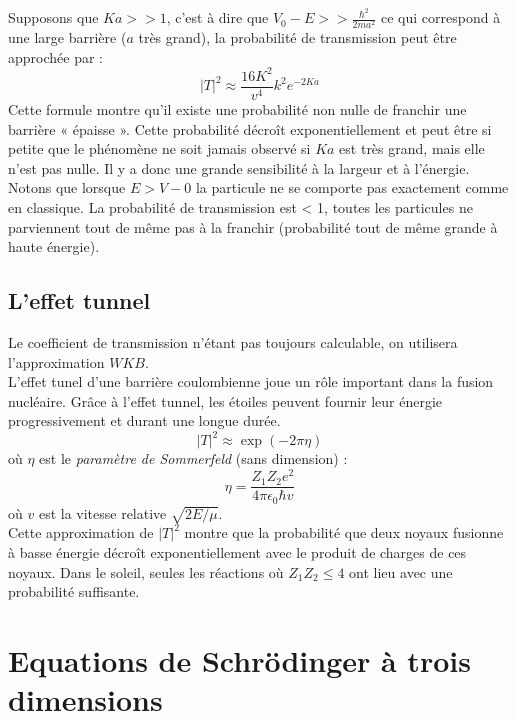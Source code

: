 \documentclass	[11pt, a4paper, openany]{book}
\begin{document}
Supposons que $Ka >> 1$, c'est à dire que $V_0 - E >> \frac{\hbar^2}{2ma^2}$ ce qui correspond à une large barrière ($a$ très grand), la probabilité de transmission peut être approchée par :
\begin{equation}
|T|^2 \approx \frac{16K^2}{v^4}k^2e^{-2Ka}
\end{equation}
Cette formule montre qu'il existe une probabilité non nulle de franchir une barrière
« épaisse ». Cette probabilité décroît exponentiellement et peut être si petite que le
phénomène ne soit jamais observé si $Ka$ est très grand, mais elle n'est pas nulle. Il y a donc une grande sensibilité à la largeur et à l'énergie.\\

Notons que lorsque $E > V-0$ la particule ne se comporte pas exactement comme en classique. La probabilité de transmission est < 1, toutes les particules ne parviennent tout de même pas à la franchir (probabilité tout de même grande à  haute énergie).


\section{L'effet tunnel}
Le coefficient de transmission n'étant pas toujours calculable, on utilisera l'approximation $WKB$.\\

L'effet tunel d'une barrière coulombienne joue un rôle important dans la fusion nucléaire. Grâce à l'effet tunnel, les étoiles peuvent fournir leur énergie progressivement et durant une longue durée.
\begin{equation}
|T|^2 \approx \exp(-2\pi\eta)
\end{equation}
où $\eta$ est le \textit{paramètre de Sommerfeld} (sans dimension) :
\begin{equation}
\eta = \frac{Z_1Z_2e^2}{4\pi\epsilon_0\hbar v}
\end{equation}
où $v$ est la vitesse relative $\sqrt{2E/\mu}$.\\

Cette approximation de $|T|^2$ montre que la probabilité que deux noyaux fusionne à basse énergie décroît exponentiellement avec le produit de charges de ces noyaux. 
Dans le soleil, seules les réactions où $Z_1Z_2 \leq 4$ ont lieu avec une probabilité suffisante.\\
\chapter{Equations de Schrödinger à trois dimensions}
\end{document}
